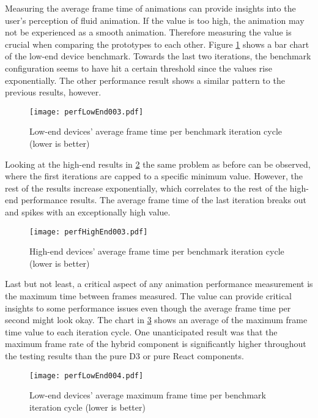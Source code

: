 
Measuring the average frame time of animations can provide insights into the user's perception of fluid animation. If the value is too high, the animation may not be experienced as a smooth animation. Therefore measuring the value is crucial when comparing the prototypes to each other. Figure \ref{fig:perfLowEnd003} shows a bar chart of the low-end device benchmark. Towards the last two iterations, the benchmark configuration seems to have hit a certain threshold since the values rise exponentially. The other performance result shows a similar pattern to the previous results, however.

\begin{figure}
\centering
\texttt{[image: perfLowEnd003.pdf]}
\caption{Low-end devices' average frame time per benchmark iteration cycle (lower is better)}
\label{fig:perfLowEnd003}
\end{figure}

Looking at the high-end results in \ref{fig:perfHighEnd003} the same problem as before can be observed, where the first iterations are capped to a specific minimum value. However, the rest of the results increase exponentially, which correlates to the rest of the high-end performance results. The average frame time of the last iteration breaks out and spikes with an exceptionally high value.

\begin{figure}
\centering
\texttt{[image: perfHighEnd003.pdf]}
\caption{High-end devices' average frame time per benchmark iteration cycle (lower is better)}
\label{fig:perfHighEnd003}
\end{figure}

Last but not least, a critical aspect of any animation performance measurement is the maximum time between frames measured. The value can provide critical insights to some performance issues even though the average frame time per second might look okay. The chart in \ref{fig:perfLowEnd004} shows an average of the maximum frame time value to each iteration cycle. One unanticipated result was that the maximum frame rate of the hybrid component is significantly higher throughout the testing results than the pure D3 or pure React components.

\begin{figure}
\centering
\texttt{[image: perfLowEnd004.pdf]}
\caption{Low-end devices' average maximum frame time per benchmark iteration cycle (lower is better)}
\label{fig:perfLowEnd004}
\end{figure}


